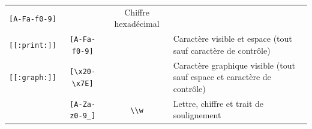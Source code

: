 \documentclass[
  11pt,
]{book}
\numberwithin{equation}{section}
\numberwithin{countremarque}{section}
\begin{document}
\begin{longtable}[]{@{}cccl@{}}
\begin{minipage}[t]{0.21\columnwidth}
\texttt{{[}A-Fa-f0-9{]}}\strut
\end{minipage} & \begin{minipage}[t]{0.21\columnwidth}\centering
\strut
\end{minipage} & \begin{minipage}[t]{0.29\columnwidth}\raggedright
Chiffre hexadécimal\strut
\end{minipage}\tabularnewline
\begin{minipage}[t]{0.17\columnwidth}\centering
\texttt{{[}{[}:print:{]}{]}}\strut
\end{minipage} & \begin{minipage}[t]{0.21\columnwidth}\centering
\texttt{{[}A-Fa-f0-9{]}}\strut
\end{minipage} & \begin{minipage}[t]{0.21\columnwidth}\centering
\strut
\end{minipage} & \begin{minipage}[t]{0.29\columnwidth}\raggedright
Caractère visible et espace (tout sauf caractère de contrôle)\strut
\end{minipage}\tabularnewline
\begin{minipage}[t]{0.17\columnwidth}\centering
\texttt{{[}{[}:graph:{]}{]}}\strut
\end{minipage} & \begin{minipage}[t]{0.21\columnwidth}\centering
\texttt{{[}\textbackslash{}x20-\textbackslash{}x7E{]}}\strut
\end{minipage} & \begin{minipage}[t]{0.21\columnwidth}\centering
\strut
\end{minipage} & \begin{minipage}[t]{0.29\columnwidth}\raggedright
Caractère graphique visible (tout sauf espace et caractère de contrôle)\strut
\end{minipage}\tabularnewline
\begin{minipage}[t]{0.17\columnwidth}\centering
\strut
\end{minipage} & \begin{minipage}[t]{0.21\columnwidth}\centering
\texttt{{[}A-Za-z0-9\_{]}}\strut
\end{minipage} & \begin{minipage}[t]{0.21\columnwidth}\centering
\texttt{\textbackslash{}\textbackslash{}w}\strut
\end{minipage} & \begin{minipage}[t]{0.29\columnwidth}\raggedright
Lettre, chiffre et trait de soulignement\strut
\end{minipage}\tabularnewline
\bottomrule
\end{longtable}
\end{document}
